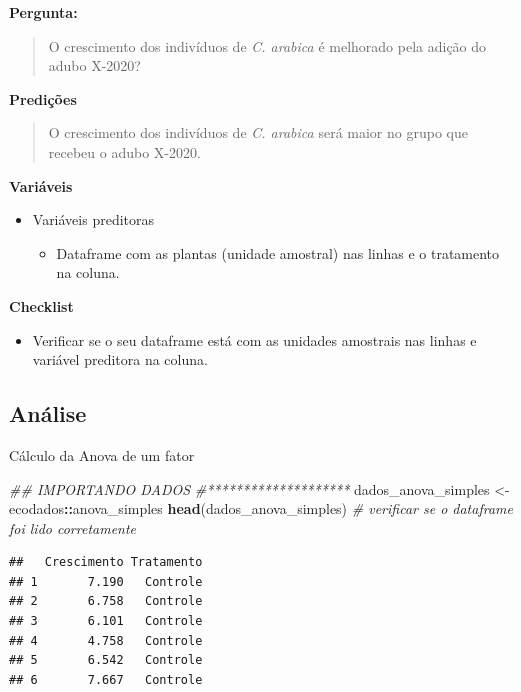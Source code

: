 \documentclass[
]{book}
\newenvironment{Shaded}{\begin{snugshade}}{\end{snugshade}}
\newcommand{\CommentTok}[1]{\textcolor[rgb]{0.56,0.35,0.01}{\textit{#1}}}
\newcommand{\KeywordTok}[1]{\textcolor[rgb]{0.13,0.29,0.53}{\textbf{#1}}}
\newcommand{\NormalTok}[1]{#1}
\newcommand{\OperatorTok}[1]{\textcolor[rgb]{0.81,0.36,0.00}{\textbf{#1}}}
\newcommand{\StringTok}[1]{\textcolor[rgb]{0.31,0.60,0.02}{#1}}
\providecommand{\tightlist}{%
  \setlength{\itemsep}{0pt}\setlength{\parskip}{0pt}}
\begin{document}
\textbf{Pergunta:}

\begin{quote}
O crescimento dos indivíduos de \emph{C. arabica} é melhorado pela adição do adubo X-2020?
\end{quote}

\textbf{Predições}

\begin{quote}
O crescimento dos indivíduos de \emph{C. arabica} será maior no grupo que recebeu o adubo X-2020.
\end{quote}

\textbf{Variáveis}

\begin{itemize}
\tightlist
\item
  Variáveis preditoras

  \begin{itemize}
  \tightlist
  \item
    Dataframe com as plantas (unidade amostral) nas linhas e o tratamento na coluna.
  \end{itemize}
\end{itemize}

\textbf{Checklist}

\begin{itemize}
\tightlist
\item
  Verificar se o seu dataframe está com as unidades amostrais nas linhas e variável preditora na coluna.
\end{itemize}

\hypertarget{anuxe1lise-6}{%
\subsection{Análise}\label{anuxe1lise-6}}

Cálculo da Anova de um fator

\begin{Shaded}
\begin{Highlighting}[]
\CommentTok{## IMPORTANDO DADOS}
\CommentTok{#********************}
\NormalTok{dados_anova_simples <-}\StringTok{ }\NormalTok{ecodados}\OperatorTok{::}\NormalTok{anova_simples}
\KeywordTok{head}\NormalTok{(dados_anova_simples) }\CommentTok{# verificar se o dataframe foi lido corretamente}
\end{Highlighting}
\end{Shaded}

\begin{verbatim}
##   Crescimento Tratamento
## 1       7.190   Controle
## 2       6.758   Controle
## 3       6.101   Controle
## 4       4.758   Controle
## 5       6.542   Controle
## 6       7.667   Controle
\end{verbatim}
\end{document}

